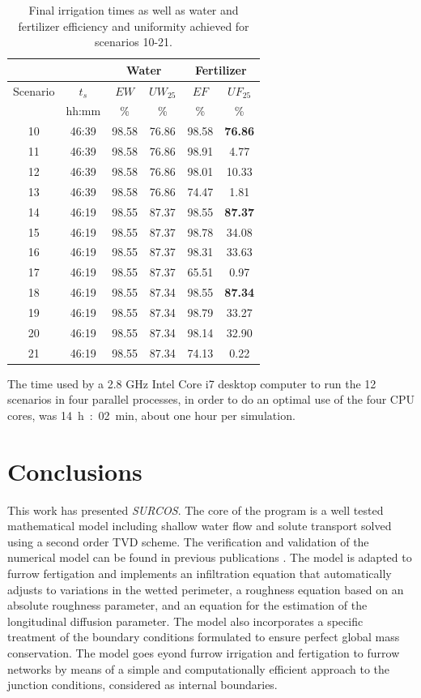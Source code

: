 \documentclass[review,authoryear]{elsarticle}
\begin{document}
\begin{table}[ht!]
\centering
\caption{Final irrigation times as well as water and fertilizer
efficiency and uniformity achieved for scenarios 10-21.\label{TabFurrowNetwork}}
\footnotesize
\begin{tabular}{|c|c|cc|cc|}
\hline
&&\multicolumn{2}{|c|}{Water}&\multicolumn{2}{|c|}{Fertilizer}\\
\hline
Scenario&$t_s$&$EW$&$UW_{25}$&$EF$&$UF_{25}$\\
&hh:mm&\%&\%&\%&\%\\
\hline
10&46:39&98.58&76.86&98.58&\bf 76.86\\
11&46:39&98.58&76.86&98.91&4.77\\
12&46:39&98.58&76.86&98.01&10.33\\
13&46:39&98.58&76.86&74.47&1.81\\
14&46:19&98.55&87.37&98.55&\bf 87.37\\
15&46:19&98.55&87.37&98.78&34.08\\
16&46:19&98.55&87.37&98.31&33.63\\
17&46:19&98.55&87.37&65.51&0.97\\
18&46:19&98.55&87.34&98.55&\bf 87.34\\
19&46:19&98.55&87.34&98.79&33.27\\
20&46:19&98.55&87.34&98.14&32.90\\
21&46:19&98.55&87.34&74.13&0.22\\
\hline
\end{tabular}
\end{table}

The time used by a 2.8 GHz Intel Core i7 desktop computer to run the 12
scenarios in four parallel processes, in order to do an optimal use of the four
CPU cores, was 14~h~:~02~min, about one hour per simulation.

\section{Conclusions}

This work has presented \emph{SURCOS}. The core of the program is a well
tested mathematical model including shallow water flow and solute transport
solved using a second order TVD scheme. The verification and validation of the
numerical model can be found in previous publications
\citep{JaviSurcos1,JaviSurcos2}. The model is adapted to furrow fertigation and
implements an infiltration equation that automatically adjusts to variations in
the wetted perimeter, a roughness equation based on an absolute roughness
parameter, and an equation for the estimation of the longitudinal diffusion
parameter. The model also incorporates a specific treatment of the boundary
conditions formulated to ensure perfect global mass conservation. The model goes
eyond furrow irrigation and fertigation to furrow networks by means of a simple
and computationally efficient approach to the junction conditions, considered as
internal boundaries.
\end{document}
